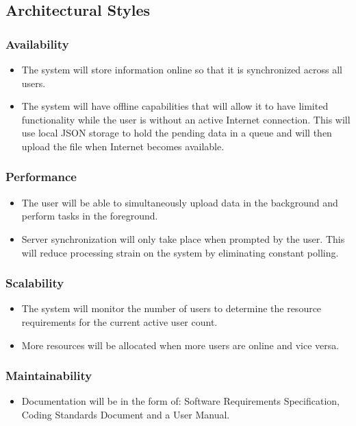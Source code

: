 \documentclass[11pt]{article}
\begin{document}
\subsection{Architectural Styles}
    \subsubsection{Availability}
    \begin{itemize}
        \item The system will store information online so that it is synchronized across all users.
        \item The system will have offline capabilities that will allow it to have limited functionality while the user is without an active Internet connection. This will use local JSON storage to hold the pending data in a queue and will then upload the file when Internet becomes available.
    \end{itemize}
    \subsubsection{Performance}
    \begin{itemize}
        \item The user will be able to simultaneously upload data in the background and perform tasks in the foreground.
        \item Server synchronization will only take place when prompted by the user. This will reduce processing strain on the system by eliminating constant polling.
    \end{itemize}
    \subsubsection{Scalability}
    \begin{itemize}
        \item The system will monitor the number of users to determine the resource requirements for the current active user count.
        \item More resources will be allocated when more users are online and vice versa.
    \end{itemize}
    \subsubsection{Maintainability}
    \begin{itemize}
        \item Documentation will be in the form of: Software Requirements Specification, Coding Standards Document and a User Manual.
    \end{itemize}
\end{document}
